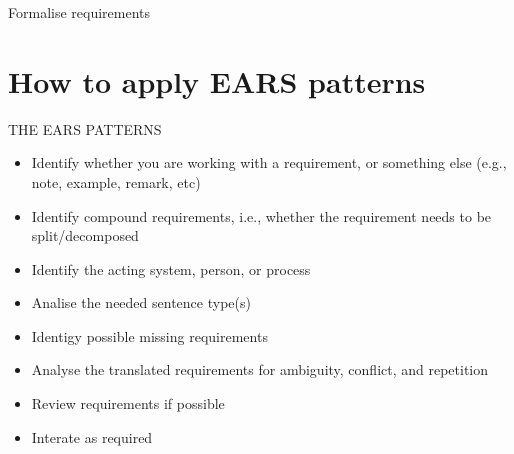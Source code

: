 \documentclass[aspectratio=169]{beamer}
\begin{document}

\begin{slide}{Formalise requirements}



\end{slide}



\section*{How to apply EARS patterns}

\begin{slide}{THE EARS PATTERNS}
  \begin{itemize}
  \item Identify whether you are working with a requirement, or something else (e.g., note, example, remark, etc)
  \item Identify compound requirements, i.e., whether the requirement needs to be split/decomposed 
  \item Identify the acting system, person, or process
  \item Analise the needed sentence type(s)
  \item Identigy possible missing requirements
  \item Analyse the translated requirements for ambiguity, conflict, and repetition
  \item Review requirements if possible
  \item Interate as required
  \end{itemize}
\end{slide}
\end{document}

